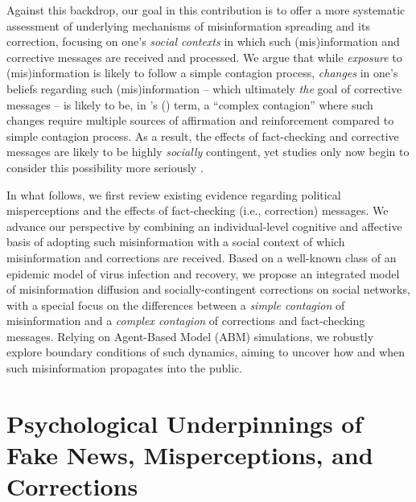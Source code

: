 \documentclass[man, 12pt, a4paper, noextraspace]{apa6}
\begin{document}
  Against this backdrop, our goal in this contribution is to offer a more systematic assessment of underlying mechanisms of misinformation spreading and its correction, focusing on one's \emph{social contexts} in which such (mis)information and corrective messages are received and processed. We argue that while \emph{exposure} to (mis)information is likely to follow a simple contagion process, \emph{changes} in one's beliefs regarding such (mis)information -- which ultimately \emph{the} goal of corrective messages -- is likely to be, in \citeauthor{centola2007complex}'s (\citeyear{centola2007complex}) term, a \enquote{complex contagion} where such changes require multiple sources of affirmation and reinforcement compared to simple contagion process. As a result, the effects of fact-checking and corrective messages are likely to be highly \emph{socially} contingent, yet studies only now begin to consider this possibility more seriously \parencite{margolin2017, bode2017see}.    
    
  In what follows, we first review existing evidence regarding political misperceptions and the effects of fact-checking (i.e., correction) messages. We advance our perspective by combining an individual-level cognitive and affective basis of adopting such misinformation with a social context of which misinformation and corrections are received. Based on a well-known class of an epidemic model of virus infection and recovery, we propose an integrated model of misinformation diffusion and socially-contingent corrections on social networks, with a special focus on the differences between a \emph{simple contagion} of misinformation and a \emph{complex contagion} of corrections and fact-checking messages. Relying on Agent-Based Model (ABM) simulations, we robustly explore boundary conditions of such dynamics, aiming to uncover how and when such misinformation propagates into the public.
    
\section{Psychological Underpinnings of Fake News, Misperceptions, and Corrections}
\end{document}
